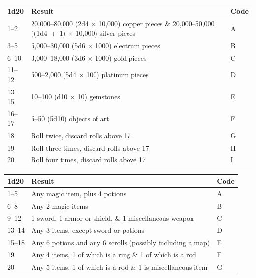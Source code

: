 \begin{multicols}{2}
\begin{minipage}{\columnwidth}
\label{hoardtype}
\noindent
\begin{tabular}{|p{}|p{}|p{}|}
\hline
1d20	& Result	& Code \\
\hline\hline
\rowcolor[gray]{.9}1--2	& 20,000--80,000 (2d4 $\times$ 10,000) copper pieces \& 
20,000--50,000 ((1d4~+~1) $\times$ 10,000) silver pieces	& A \\
3--5	& 5,000--30,000 (5d6 $\times$ 1000) electrum pieces	& B \\
\rowcolor[gray]{.9}6--10	& 3,000--18,000 (3d6 $\times$ 1000) gold pieces	& C \\
11--12	& 500--2,000 (5d4 $\times$ 100) platinum pieces	& D \\
\rowcolor[gray]{.9}13--15	& 10--100 (d10 $\times$ 10) gemstones	& E \\
16--17 	& 5--50 (5d10) objects of art	& F \\
\rowcolor[gray]{.9}18	& Roll twice, discard rolls above 17	& G \\
19	& Roll three times, discard rolls above 17	& H \\
\rowcolor[gray]{.9}20	& Roll four times, discard rolls above 17	& I \\
\hline
\end{tabular}

\end{minipage}

\noindent
\begin{minipage}{\columnwidth}

\label{magichoardtype}
\noindent
\begin{tabular}{|p{}|p{}|p{}|}
\hline
1d20	& Result	& Code \\
\hline\hline
\rowcolor[gray]{.9}1--5	& Any magic item, plus 4 potions	& A \\
6--8	& Any 2 magic items	& B \\
\rowcolor[gray]{.9}9--12	& 1 sword, 1 armor or shield, \& 1 miscellaneous weapon	& C \\
13--14	& Any 3 items, except sword or potions	& D \\
\rowcolor[gray]{.9}15--18	& Any 6 potions and any 6 scrolls (possibly including a map)	& E \\
19	& Any 4 items, 1 of which is a ring \& 1 of which is a rod	& F \\
\rowcolor[gray]{.9}20	& Any 5 items, 1 of which is a rod \& 1 is miscellaneous item	& G \\
\hline
\end{tabular}


\end{minipage}
\end{multicols}
